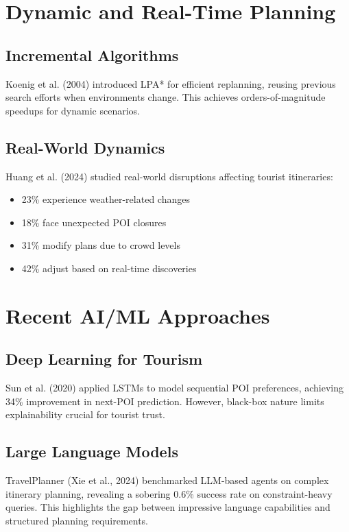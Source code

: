 \section{Dynamic and Real-Time Planning}

\subsection{Incremental Algorithms}

Koenig et al. (2004) introduced LPA* for efficient replanning, reusing previous search efforts when environments change. This achieves orders-of-magnitude speedups for dynamic scenarios.

\subsection{Real-World Dynamics}

Huang et al. (2024) studied real-world disruptions affecting tourist itineraries:
\begin{itemize}
    \item 23\% experience weather-related changes
    \item 18\% face unexpected POI closures
    \item 31\% modify plans due to crowd levels
    \item 42\% adjust based on real-time discoveries
\end{itemize}

\section{Recent AI/ML Approaches}

\subsection{Deep Learning for Tourism}

Sun et al. (2020) applied LSTMs to model sequential POI preferences, achieving 34\% improvement in next-POI prediction. However, black-box nature limits explainability crucial for tourist trust.

\subsection{Large Language Models}

TravelPlanner (Xie et al., 2024) benchmarked LLM-based agents on complex itinerary planning, revealing a sobering 0.6\% success rate on constraint-heavy queries. This highlights the gap between impressive language capabilities and structured planning requirements.

